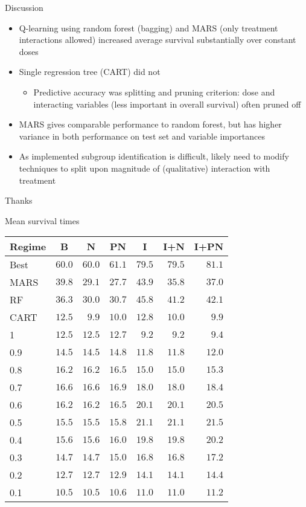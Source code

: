 \documentclass[handout]{beamer}
\begin{document}
\begin{frame}[t]{Discussion}
  \begin{itemize}[<+->]
    \item Q-learning using random forest (bagging) and MARS (only treatment interactions allowed) increased average survival substantially over constant doses
    \item Single regression tree (CART) did not
    \begin{itemize}
      \item Predictive accuracy was splitting and pruning criterion: dose and interacting variables (less important in overall survival) often pruned off 
    \end{itemize}
    \item MARS gives comparable performance to random forest, but has higher variance in both performance on test set and variable importances 
    \item As implemented subgroup identification is difficult, likely need to modify techniques to split upon magnitude of (qualitative) interaction with treatment 
  \end{itemize}
\end{frame}



\begin{frame}[standout]
  Thanks
\end{frame}

\appendix

\begin{frame}[c]{Mean survival times}
  \begin{table}
  \small
  \centering
  \begin{tabular}{lrrrrrr}
  \toprule \multicolumn{1}{c}{Regime}&\multicolumn{1}{c}{B}&\multicolumn{1}{c}{N}&\multicolumn{1}{c}{PN}&\multicolumn{1}{c}{I}&\multicolumn{1}{c}{I+N}&\multicolumn{1}{c}{I+PN}\tabularnewline
  \midrule
  Best&$60.0$&$60.0$&$61.1$&$79.5$&$79.5$&$81.1$\tabularnewline
  MARS&$39.8$&$29.1$&$27.7$&$43.9$&$35.8$&$37.0$\tabularnewline
  RF&$36.3$&$30.0$&$30.7$&$45.8$&$41.2$&$42.1$\tabularnewline
  CART&$12.5$&$ 9.9$&$10.0$&$12.8$&$10.0$&$ 9.9$\tabularnewline
  1&$12.5$&$12.5$&$12.7$&$ 9.2$&$ 9.2$&$ 9.4$\tabularnewline
  0.9&$14.5$&$14.5$&$14.8$&$11.8$&$11.8$&$12.0$\tabularnewline
  0.8&$16.2$&$16.2$&$16.5$&$15.0$&$15.0$&$15.3$\tabularnewline
  0.7&$16.6$&$16.6$&$16.9$&$18.0$&$18.0$&$18.4$\tabularnewline
  0.6&$16.2$&$16.2$&$16.5$&$20.1$&$20.1$&$20.5$\tabularnewline
  0.5&$15.5$&$15.5$&$15.8$&$21.1$&$21.1$&$21.5$\tabularnewline
  0.4&$15.6$&$15.6$&$16.0$&$19.8$&$19.8$&$20.2$\tabularnewline
  0.3&$14.7$&$14.7$&$15.0$&$16.8$&$16.8$&$17.2$\tabularnewline
  0.2&$12.7$&$12.7$&$12.9$&$14.1$&$14.1$&$14.4$\tabularnewline
  0.1&$10.5$&$10.5$&$10.6$&$11.0$&$11.0$&$11.2$\tabularnewline
  \bottomrule
  \end{tabular}
  \end{table}
\end{frame}
\end{document}
